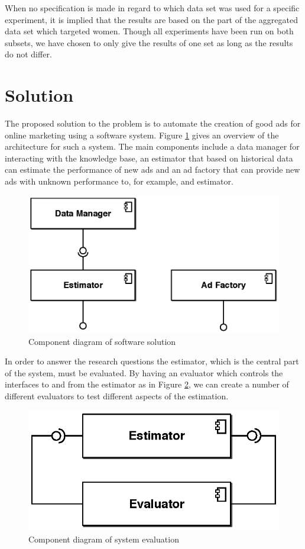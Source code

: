 \documentclass{sig-alternate}
\begin{document}
When no specification is made in regard to which data set was used for a specific experiment, it is implied that the results are based on the part of the aggregated data set which targeted women. Though all experiments have been run on both subsets, we have chosen to only give the results of one set as long as the results do not differ.

\section{Solution}
\label{ch:Solution}
The proposed solution to the problem is to automate the creation of good ads for online marketing using a software system. Figure \ref{fig:SWArchitecture} gives an overview of the architecture for such a system. The main components include a data manager for interacting with the knowledge base, an estimator that based on historical data can estimate the performance of new ads and an ad factory that can provide new ads with unknown performance to, for example, and estimator.

\begin{figure}[htpb]
	\centering
	\includegraphics[width=\columnwidth]{sw-architecture.eps}
	\caption{Component diagram of software solution}
	\label{fig:SWArchitecture}
\end{figure}

In order to answer the research questions the estimator, which is the central part of the system, must be evaluated. By having an evaluator which controls the interfaces to and from the estimator as in Figure \ref{fig:SWEvaluator}, we can create a number of different evaluators to test different aspects of the estimation.

\begin{figure}[htpb]
	\centering
	\includegraphics[width=0.65\columnwidth]{sw-evaluator.eps}
	\caption{Component diagram of system evaluation}
	\label{fig:SWEvaluator}
\end{figure}
\end{document}
